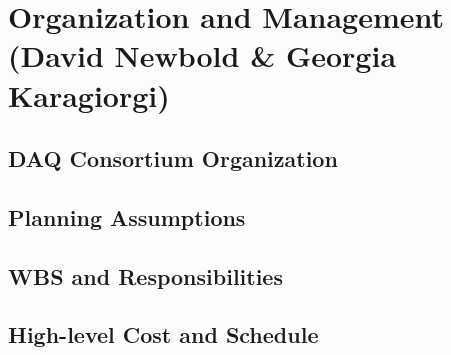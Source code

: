 
\section{Organization and Management (David Newbold \& Georgia Karagiorgi)}
\label{sec:fdsp-daq-org}



\subsection{DAQ Consortium Organization}
\label{sec:fdsp-daq-org-consortium}


\subsection{Planning Assumptions}
\label{sec:fdsp-daq-org-assmp}


\subsection{WBS and Responsibilities}
\label{sec:fdsp-daq-org-wbs}

\subsection{High-level Cost and Schedule}
\label{sec:fdsp-daq-org-cs}

